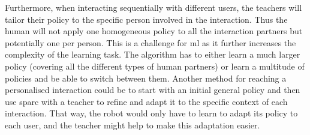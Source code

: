 Furthermore, when interacting sequentially with different users, the teachers will tailor their policy to the specific person involved in the interaction. Thus the human will not apply one homogeneous policy to all the interaction partners but potentially one per person. 
This is a challenge for \gls{ml} as it further increases the complexity of the learning task. The algorithm has to either learn a much larger policy (covering all the different types of human partners) or learn a multitude of policies and be able to switch between them. Another method for reaching a personalised interaction could be to start with an initial general policy and then use \gls{sparc} with a teacher to refine and adapt it to the specific context of each interaction. That way, the robot would only have to learn to adapt its policy to each user, and the teacher might help to make this adaptation easier.





